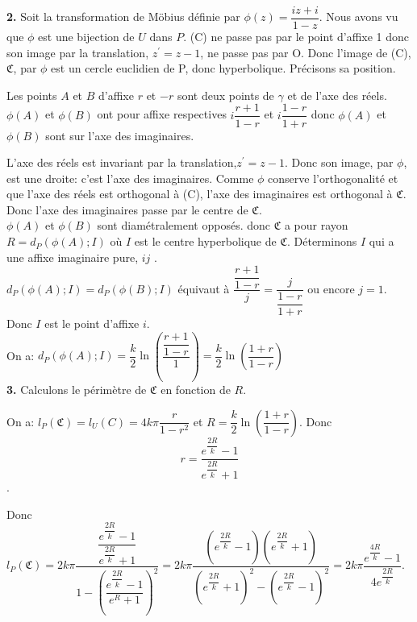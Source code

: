 \documentclass[a4paper, 12pt, twoside]{book}
\begin{document}
  \textbf{2.} Soit la transformation de Möbius définie par $\phi(z)=\dfrac{iz+i}{1-z}$. Nous avons vu que $\phi$ est une bijection de $U$ dans $P$. (C) ne passe pas par le point d'affixe 1 donc son image par la translation, $z^{'}=z-1$, ne passe pas par O. Donc l'image de (C), $\mathfrak{C}$, par $\phi$ est un cercle euclidien de P, donc hyperbolique. Précisons sa position.\
  
  Les points $A$ et $B$ d'affixe $r$ et $-r$ sont deux points de $\gamma$ et de l'axe des réels. $\phi(A)$ et $\phi(B)$ ont pour affixe respectives $i\dfrac{r+1}{1-r}$ et $i\dfrac{1-r}{1+r}$ donc $\phi(A)$ et $\phi(B)$ sont sur l'axe des imaginaires.\
  
  L'axe des réels est invariant par la translation,$z^{'}=z-1$. Donc son image, par $\phi$, est une droite: c'est l'axe des imaginaires. Comme $\phi$ conserve l'orthogonalité et que l'axe des réels est orthogonal à (C), l'axe des imaginaires est orthogonal à  $\mathfrak{C}$. Donc  l'axe des imaginaires passe par le centre de  $\mathfrak{C}$.\\
  
 $\phi(A)$ et $\phi(B)$ sont diamétralement opposés. donc $\mathfrak{C}$ a pour rayon $R=d_{P}(\phi(A);I)$ où $I$ est le centre hyperbolique de  $\mathfrak{C}$. Déterminons $I$ qui a une affixe imaginaire pure, $ij$ .\\
 
  $d_{P}(\phi(A);I)=d_{P}(\phi(B);I)$ équivaut à $\dfrac{\dfrac{r+1}{1-r}}{j}=\dfrac{j}{\dfrac{1-r}{1+r}}$ ou encore $j=1$. Donc $I$ est le point d'affixe $i$.\\
  
 
 
 On a: $d_{P}(\phi(A);I)=\dfrac{k}{2}\ln(\dfrac{\dfrac{r+1}{1-r}}{1})=\dfrac{k}{2}\ln(\dfrac{1+r}{1-r})$ \\
 
  
  \textbf{3.} Calculons le périmètre de $\mathfrak{C}$ en fonction de $R$.\
 
 
 On a: $l_{P}(\mathfrak{C})=l_{U}(C)=4k\pi \dfrac{r}{1-r^{2}}$ et $R=\dfrac{k}{2}\ln(\dfrac{1+r}{1-r})$. Donc  $$r=\dfrac{e^{\dfrac{2R}{k}}-1}{e^{\dfrac{2R}{k}}+1}$$.
  
  
Donc  $l_{P}(\mathfrak{C})=2k\pi\dfrac{\dfrac{e^{\dfrac{2R}{k}}-1}{e^{\dfrac{2R}{k}}+1}}{1-(\dfrac{e^{\dfrac{2R}{k}}-1}{e^{R}+1})^{2}}=2k\pi \dfrac{(e^{\dfrac{2R}{k}}-1)(e^{\dfrac{2R}{k}}+1)}{(e^{\dfrac{2R}{k}}+1)^{2}-(e^{\dfrac{2R}{k}}-1)^{2}}=2k\pi \dfrac{e^{\dfrac{4R}{k}}-1}{4e^{\dfrac{2R}{k}}}$.\
\end{document}
